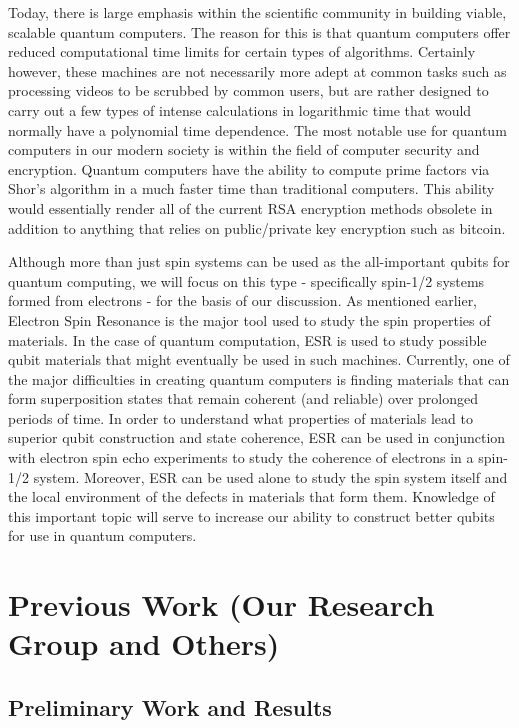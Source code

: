\documentclass[oneside, astronomy, noacknowlegments]{BYUPhys}
\begin{document}
Today, there is large emphasis within the scientific community in building viable, scalable quantum computers. The reason for this is that quantum computers offer reduced computational time limits for certain types of algorithms. Certainly however, these machines are not necessarily more adept at common tasks such as processing videos to be scrubbed by common users, but are rather designed to carry out a few types of intense calculations in logarithmic time that would normally have a polynomial time dependence. The most notable use for quantum computers in our modern society is within the field of computer security and encryption. Quantum computers have the ability to compute prime factors via Shor's algorithm in a much faster time than traditional computers. This ability would essentially render all of the current RSA encryption methods obsolete in addition to anything that relies on public/private key encryption such as bitcoin.

Although more than just spin systems can be used as the all-important qubits for quantum computing, we will focus on this type - specifically spin-1/2 systems formed from electrons - for the basis of our discussion. As mentioned earlier, Electron Spin Resonance is the major tool used to study the spin properties of materials. In the case of quantum computation, ESR is used to study possible qubit materials that might eventually be used in such machines. Currently, one of the major difficulties in creating quantum computers is finding materials that can form superposition states that remain coherent (and reliable) over prolonged periods of time. In order to understand what properties of materials lead to superior qubit construction and state coherence, ESR can be used in conjunction with electron spin echo experiments to study the coherence of electrons in a spin-1/2 system. Moreover, ESR can be used alone to study the spin system itself and the local environment of the defects in materials that form them. Knowledge of this important topic will serve to increase our ability to construct better qubits for use in quantum computers.

\section{Previous Work (Our Research Group and Others)}

\subsection{Preliminary Work and Results}
\end{document}
